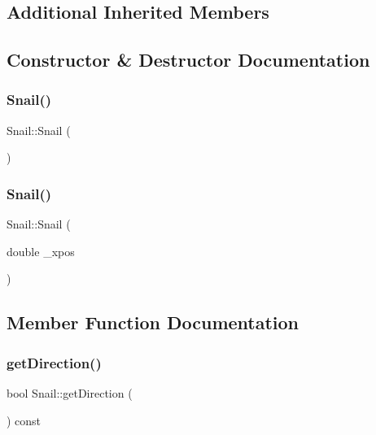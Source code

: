 \subsection*{Additional Inherited Members}


\subsection{Constructor \& Destructor Documentation}
\mbox{\label{class_snail_ac5501ca7ead01b2ba0b7286503599f68}} 
\subsubsection{\texorpdfstring{Snail()}{Snail()}\hspace{0.1cm}{\footnotesize\ttfamily [1/2]}}
{\footnotesize\ttfamily Snail\+::\+Snail (\begin{DoxyParamCaption}{ }\end{DoxyParamCaption})}

\mbox{\label{class_snail_a89de76e5c6b4087c0ed7ac2809f0c45b}} 
\subsubsection{\texorpdfstring{Snail()}{Snail()}\hspace{0.1cm}{\footnotesize\ttfamily [2/2]}}
{\footnotesize\ttfamily Snail\+::\+Snail (\begin{DoxyParamCaption}\item[{double}]{\+\_\+xpos }\end{DoxyParamCaption})}



\subsection{Member Function Documentation}
\mbox{\label{class_snail_a1cc5dc295038ac11f138ac49cdcfffc3}} 
\subsubsection{\texorpdfstring{get\+Direction()}{getDirection()}}
{\footnotesize\ttfamily bool Snail\+::get\+Direction (\begin{DoxyParamCaption}{ }\end{DoxyParamCaption}) const}

